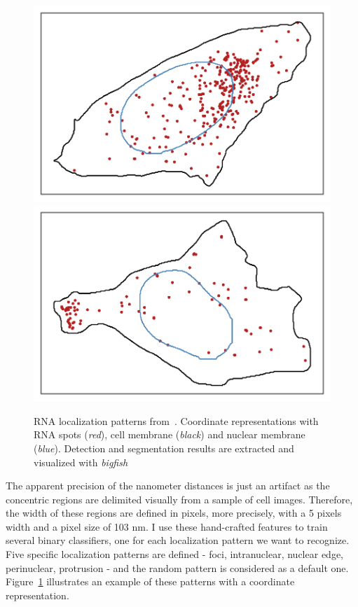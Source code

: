 \begin{figure}[]
	\endminipage\hfill
		\includegraphics[trim={0.5cm 0.5cm 0.5cm 0.5cm},clip,width=\linewidth]{figures/chapter5/plot_perinuclear}
	\endminipage\hfill
		\includegraphics[trim={0.5cm 0.5cm 0.5cm 0.5cm},clip,width=\linewidth]{figures/chapter5/plot_protrusion}
	\endminipage
	\caption{RNA localization patterns from~\cite{CHOUAIB_2020}.
	Coordinate representations with RNA spots (\textit{red}), cell membrane (\textit{black}) and nuclear membrane (\textit{blue}).
	Detection and segmentation results are extracted and visualized with \emph{bigfish}}
	\label{fig:localization_patterns_racha_features}
\end{figure}

The apparent precision of the nanometer distances is just an artifact as the concentric regions are delimited visually from a sample of cell images.
Therefore, the width of these regions are defined in pixels, more precisely, with a 5 pixels width and a pixel size of 103 nm.
I use these hand-crafted features to train several binary classifiers, one for each localization pattern we want to recognize.
Five specific localization patterns are defined - foci, intranuclear, nuclear edge, perinuclear, protrusion - and the random pattern is considered as a default one.
Figure~\ref{fig:localization_patterns_racha_features} illustrates an example of these patterns with a coordinate representation.


